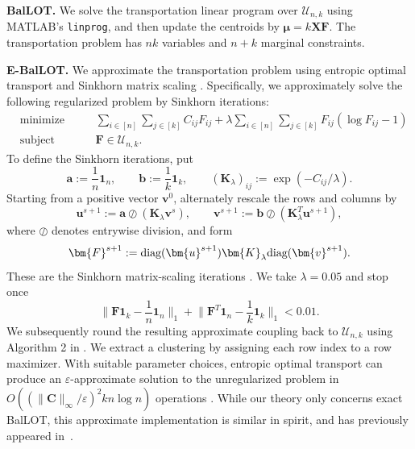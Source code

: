 \documentclass{article}
\theoremstyle{plain}
\theoremstyle{definition}
\newcommand{\1}{\mathbf{1}}
\newcommand{\Rdk}{\mathbb{R}^{d\times k}}
\newcommand{\bUnk}{\mathcal{U}_{n,k}}
\newcommand{\bmF}{\bm{F}}
\newcommand{\bmu}{\bm{\mu}}
\newcommand{\diag}{\textnormal{diag}}
\begin{document}
\medskip
\noindent
\textbf{BalLOT.}
We solve the transportation linear program over $\bUnk$ using MATLAB's \texttt{linprog}, and then update the centroids by $\bmu=k\bm{X}\bmF$.
The transportation problem has $nk$ variables and $n+k$ marginal constraints.

\medskip
\noindent
\textbf{E-BalLOT.}
We approximate the transportation problem using entropic optimal transport and Sinkhorn matrix scaling \cite{cuturi2013sinkhorn}.
Specifically, we approximately solve the following regularized problem by Sinkhorn iterations:
\[
\begin{aligned}
&\text{minimize} &&\quad
\sum_{i\in[n]}\sum_{j\in[k]}C_{ij}F_{ij}
+\lambda\sum_{i\in[n]}\sum_{j\in[k]}F_{ij}(\log F_{ij}-1)\\
&\text{subject to} &&\quad \bmF\in\bUnk.
\end{aligned}
\]
To define the Sinkhorn iterations, put
\[
\bm{a}:=\frac{1}{n}\bm{1}_n,
\qquad
\bm{b}:=\frac{1}{k}\bm{1}_k,
\qquad
(\bm{K}_\lambda)_{ij}:=\exp(-C_{ij}/\lambda).
\]
Starting from a positive vector $\bm{v}^0$, alternately rescale the rows and columns by
\[
\bm{u}^{s+1}:=\bm{a}\oslash(\bm{K}_\lambda\bm{v}^s),
\qquad
\bm{v}^{s+1}:=\bm{b}\oslash(\bm{K}_\lambda^T\bm{u}^{s+1}),
\]
where $\oslash$ denotes entrywise division, and form
\[
\bmF^{s+1}:=\diag(\bm{u}^{s+1})\bm{K}_\lambda\diag(\bm{v}^{s+1}).
\]
These are the Sinkhorn matrix-scaling iterations \cite{cuturi2013sinkhorn,Peyr2018ComputationalOT}.
We take $\lambda=0.05$ and stop once
\[
\bigg\|\bmF\bm{1}_k-\frac{1}{n}\bm{1}_n\bigg\|_1
+
\bigg\|\bmF^T\bm{1}_n-\frac{1}{k}\bm{1}_k\bigg\|_1
<0.01.
\]
We subsequently round the resulting approximate coupling back to $\bUnk$ using Algorithm 2 in \cite{altschuler2017near}.
We extract a clustering by assigning each row index to a row maximizer.
With suitable parameter choices, entropic optimal transport can produce an $\varepsilon$-approximate solution to the unregularized problem in
$O((\|\bm{C}\|_\infty/\varepsilon)^2kn\log n)$ operations \cite{dvurechensky2018computational}.
While our theory only concerns exact BalLOT, this approximate implementation is similar in spirit, and has previously appeared in~\cite{CuturiDoucet2014WassersteinBarycenters}.

\end{document}

